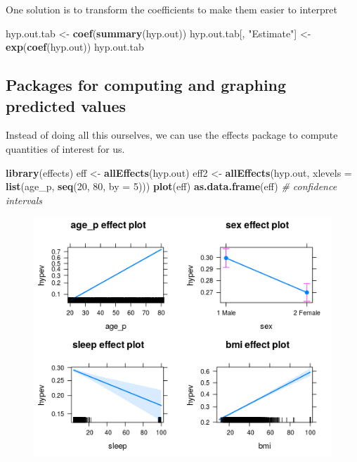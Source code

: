 \documentclass[]{book}
\newenvironment{Shaded}{\begin{snugshade}}{\end{snugshade}}
\newcommand{\KeywordTok}[1]{\textcolor[rgb]{0.13,0.29,0.53}{\textbf{#1}}}
\newcommand{\DataTypeTok}[1]{\textcolor[rgb]{0.13,0.29,0.53}{#1}}
\newcommand{\DecValTok}[1]{\textcolor[rgb]{0.00,0.00,0.81}{#1}}
\newcommand{\StringTok}[1]{\textcolor[rgb]{0.31,0.60,0.02}{#1}}
\newcommand{\CommentTok}[1]{\textcolor[rgb]{0.56,0.35,0.01}{\textit{#1}}}
\newcommand{\NormalTok}[1]{#1}
\begin{document}
One solution is to transform the coefficients to make them easier to
interpret

\begin{Shaded}
\begin{Highlighting}[]
\NormalTok{  hyp.out.tab <-}\StringTok{ }\KeywordTok{coef}\NormalTok{(}\KeywordTok{summary}\NormalTok{(hyp.out))}
\NormalTok{  hyp.out.tab[, }\StringTok{"Estimate"}\NormalTok{] <-}\StringTok{ }\KeywordTok{exp}\NormalTok{(}\KeywordTok{coef}\NormalTok{(hyp.out))}
\NormalTok{  hyp.out.tab}
\end{Highlighting}
\end{Shaded}

\subsection{Packages for computing and graphing predicted
values}\label{packages-for-computing-and-graphing-predicted-values}

Instead of doing all this ourselves, we can use the effects package to
compute quantities of interest for us.

\begin{Shaded}
\begin{Highlighting}[]
  \KeywordTok{library}\NormalTok{(effects)}
\NormalTok{  eff <-}\StringTok{ }\KeywordTok{allEffects}\NormalTok{(hyp.out)}
\NormalTok{  eff2 <-}\StringTok{ }\KeywordTok{allEffects}\NormalTok{(hyp.out, }\DataTypeTok{xlevels =} \KeywordTok{list}\NormalTok{(age_p, }\KeywordTok{seq}\NormalTok{(}\DecValTok{20}\NormalTok{, }\DecValTok{80}\NormalTok{, }\DataTypeTok{by =} \DecValTok{5}\NormalTok{)))}
  \KeywordTok{plot}\NormalTok{(eff)}
  \KeywordTok{as.data.frame}\NormalTok{(eff) }\CommentTok{# confidence intervals}
\end{Highlighting}
\end{Shaded}

\begin{figure}
\centering
\includegraphics{R/Rmodels/images/effects1.png}
\caption{}
\end{figure}
\end{document}
